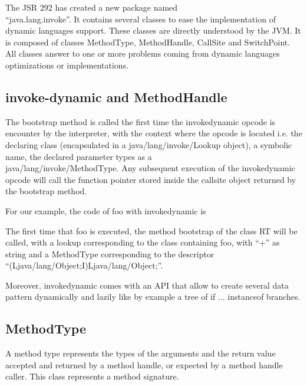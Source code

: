 \documentclass{sig-alternate}
\def \Jsr{JSR\xspace}
\def \JSR{\Jsr 292\xspace}
\def \JVM{JVM\xspace}
\begin{document}
      The \JSR has created a new package named\\ ``java.lang.invoke''.
      It contains several classes to ease the implementation of dynamic languages support.
      These classes are directly understood by the \JVM.
      It is composed of classes MethodType, MethodHandle, CallSite and SwitchPoint.
      All classes answer to one or more problems coming from dynamic languages optimizations or implementations.

    \subsection{invoke-dynamic and MethodHandle}

      The bootstrap method is called the first time the invokedynamic opcode is encounter by the interpreter,
      with the context where the opcode is located i.e.
      the declaring class (encapsulated in a java/lang/invoke/Lookup object), a symbolic name,
      the declared parameter types as a\\ java/lang/invoke/MethodType.
      Any subsequent execution of the invokedynamic opcode will call the function pointer
      stored inside the callsite object returned by the bootstrap method.
      
      For our example, the code of foo with invokedynamic is

      

      The first time that foo is executed, the method bootstrap of the class RT will be called, with a lookup corresponding to the class containing foo,
      with ``+'' as string and a MethodType corresponding to the descriptor\\ ``(Ljava/lang/Object;I)Ljava/lang/Object;''.%

      

      Moreover, invokedynamic comes with an API that allow to create several data pattern
      dynamically and lazily like by example a tree of if ... instanceof branches.

    \subsection{MethodType}

      A method type represents the types of the arguments and the return value accepted and returned by a method handle,
      or expected by a method handle caller.
      This class represents a method signature.
\end{document}
